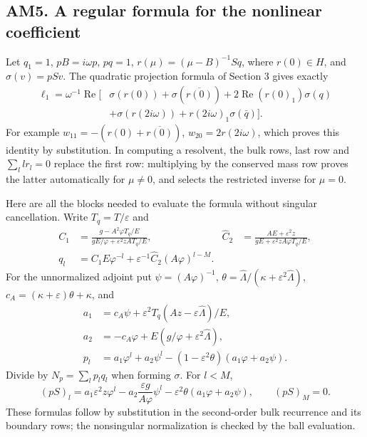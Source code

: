 \subsection{AM5. A regular formula for the nonlinear coefficient}
Let $q_1=1$, $pB=i\omega p$, $pq=1$, $r(\mu)=(\mu-B)^{-1}Sq$, where $r(0)\in H$,
and $\sigma(v)=pSv$. The quadratic projection formula of Section 3 gives exactly
\begin{align*}
 \ell_1=\omega^{-1}\operatorname{Re}\big[&\sigma(r(0))+\sigma(\overline{r(0)})
 +2\operatorname{Re}(r(0)_1)\sigma(q)\\
 &+\sigma(r(2i\omega))+r(2i\omega)_1\sigma(\bar q)\big].
\end{align*}
For example $w_{11}=-(r(0)+\overline{r(0)})$, $w_{20}=2r(2i\omega)$, which proves
this identity by substitution. In computing a resolvent, the bulk rows, last row and
$\sum_l l r_l=0$ replace the first row: multiplying by the conserved mass row proves
the latter automatically for $\mu\ne0$, and selects the restricted inverse for $\mu=0$.

Here are all the blocks needed to evaluate the formula without singular cancellation.
Write $T_q=T/\varepsilon$ and
\begin{align*}
 C_1&=\frac{g-A^2\varphi T_q/E}{gE/\varphi+\varepsilon^2zAT_q/E},&
 \widehat C_2&=\frac{AE+\varepsilon^2z}{gE+\varepsilon^2zA\varphi T_q/E},\\
 q_l&=C_1E\varphi^{-l}+\varepsilon^{-1}\widehat C_2(A\varphi)^{l-M}.&&
\end{align*}
For the unnormalized adjoint put $\psi=(A\varphi)^{-1}$,
$\theta=\widehat\Lambda/(\kappa+\varepsilon^2\widehat\Lambda)$,
$c_A=(\kappa+\varepsilon)\theta+\kappa$, and
\begin{align*}
 a_1&=c_A\psi+\varepsilon^2T_q(Az-\varepsilon\widehat\Lambda)/E,\\
 a_2&=-c_A\varphi+E(g/\varphi+\varepsilon^2\widehat\Lambda),\\
 p_l&=a_1\varphi^l+a_2\psi^l-(1-\varepsilon^2\theta)(a_1\varphi+a_2\psi).
\end{align*}
Divide by $N_p=\sum_l p_lq_l$ when forming $\sigma$. For $l<M$,
\[
 (pS)_l=a_1\varepsilon^2z\varphi^l-a_2\frac{\varepsilon g}{A\varphi}\psi^l
             -\varepsilon^2\theta(a_1\varphi+a_2\psi),\qquad(pS)_M=0.
\]
These formulas follow by substitution in the second-order bulk recurrence and its
boundary rows; the nonsingular normalization is checked by the ball evaluation.

